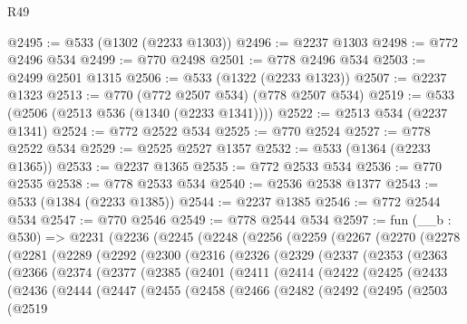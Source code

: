 \begin{lexlean}{R49}
\begin{coremodule}
@2495 := @533 (@1302 (@2233 @1303))
@2496 := @2237 @1303
@2498 := @772 @2496 @534
@2499 := @770 @2498
@2501 := @778 @2496 @534
@2503 := @2499 @2501 @1315
@2506 := @533 (@1322 (@2233 @1323))
@2507 := @2237 @1323
@2513 := @770 (@772 @2507 @534) (@778 @2507 @534)
@2519 := @533 (@2506 (@2513 @536 (@1340 (@2233 @1341))))
@2522 := @2513 @534 (@2237 @1341)
@2524 := @772 @2522 @534
@2525 := @770 @2524
@2527 := @778 @2522 @534
@2529 := @2525 @2527 @1357
@2532 := @533 (@1364 (@2233 @1365))
@2533 := @2237 @1365
@2535 := @772 @2533 @534
@2536 := @770 @2535
@2538 := @778 @2533 @534
@2540 := @2536 @2538 @1377
@2543 := @533 (@1384 (@2233 @1385))
@2544 := @2237 @1385
@2546 := @772 @2544 @534
@2547 := @770 @2546
@2549 := @778 @2544 @534
@2597 := fun (__b : @530) =>
  @2231
    (@2236
      (@2245
        (@2248
          (@2256
            (@2259
              (@2267
                (@2270
                  (@2278
                    (@2281
                      (@2289
                        (@2292
                          (@2300
                            (@2316
                              (@2326
                                (@2329
                                  (@2337
                                    (@2353
                                      (@2363
                                        (@2366
                                          (@2374
                                            (@2377
                                              (@2385
                                                (@2401
                                                  (@2411
                                                    (@2414
                                                      (@2422
                                                        (@2425
                                                          (@2433
                                                            (@2436
                                                              (@2444
                                                                (@2447
                                                                  (@2455
                                                                    (@2458
                                                                      (@2466
                                                                        (@2482
                                                                          (@2492
                                                                            (@2495
                                                                              (@2503
                                                                                (@2519

\end{coremodule}
\end{lexlean}
